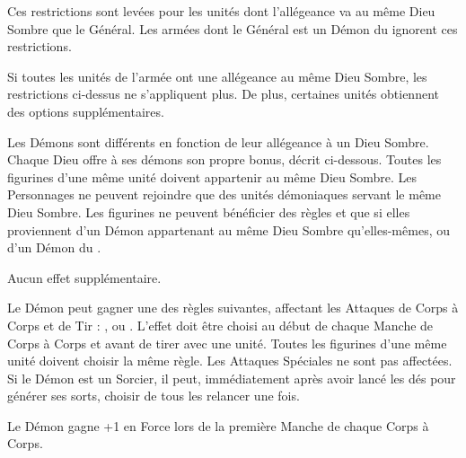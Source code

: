 Ces restrictions sont levées pour les unités dont l'allégeance va au même Dieu Sombre que le Général. Les armées dont le Général est un Démon du \truechaos{} ignorent ces restrictions.

\armyspecialruleentry{\monotheistarmybonus}

Si toutes les unités de l'armée ont une allégeance au même Dieu Sombre, les restrictions ci-dessus ne s'appliquent plus. De plus, certaines unités obtiennent des options supplémentaires.

\closearmywiderules









\newpage
\startarmyspecialrules

\armyspecialruleentry{\daemonofthedarkgods}

Les Démons sont différents en fonction de leur allégeance à un Dieu Sombre. Chaque Dieu offre à ses démons son propre bonus, décrit ci-dessous. Toutes les figurines d'une même unité doivent appartenir au même Dieu Sombre. Les Personnages ne peuvent rejoindre que des unités démoniaques servant le même Dieu Sombre. Les figurines ne peuvent bénéficier des règles \holdyourground{} et \inspiringpresence{} que si elles proviennent d'un Démon appartenant au même Dieu Sombre qu'elles-mêmes, ou d'un Démon du \truechaos{}.

\spacebetweenalliance{}

\hfill{}
Aucun effet supplémentaire.
\allianceclosesidetext{}

\spacebetweenalliance{}

Le Démon peut gagner une des règles suivantes, affectant les Attaques de Corps à Corps et de Tir : \divineattacks{}, \flamingattacks{} ou \hellfire{}. L'effet doit être choisi au début de chaque Manche de Corps à Corps et avant de tirer avec une unité. Toutes les figurines d'une même unité doivent choisir la même règle. Les Attaques Spéciales ne sont pas affectées. Si le Démon est un Sorcier, il peut, immédiatement après avoir lancé les dés pour générer ses sorts, choisir de tous les relancer une fois.
\allianceclosesidetext{}\hfill
{}

\spacebetweenalliance{}

\hfill{}
Le Démon gagne +1 en Force lors de la première Manche de chaque Corps à Corps.
\allianceclosesidetext{}

